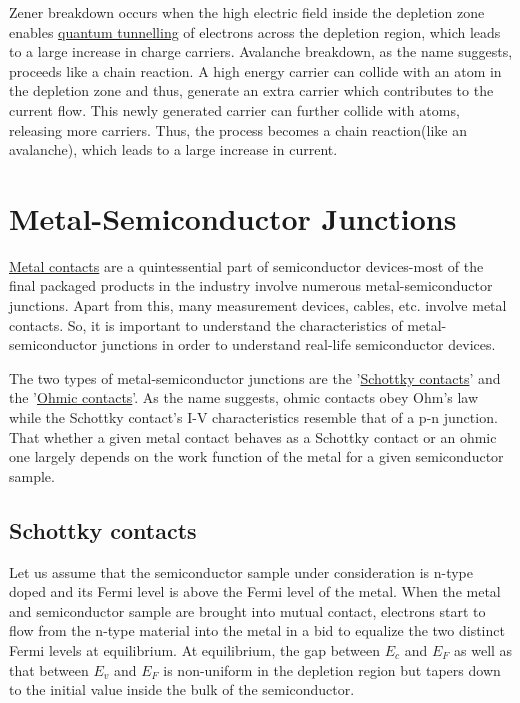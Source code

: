 \documentclass[12 pt]{article}
\begin{document}
Zener breakdown occurs when the high electric field inside the depletion zone enables \href{https://en.wikipedia.org/wiki/Quantum_tunnelling}{quantum tunnelling} of electrons across the depletion region, which leads to a large increase in charge carriers. Avalanche breakdown, as the name suggests, proceeds like a chain reaction. A high energy carrier can collide with an atom in the depletion zone and thus, generate an extra carrier which contributes to the current flow. This newly generated carrier can further collide with atoms, releasing more carriers. Thus, the process becomes a chain reaction(like an avalanche), which leads to a large increase in current. 

\section{Metal-Semiconductor Junctions}

\href{https://eng.libretexts.org/Bookshelves/Materials_Science/Supplemental_Modules_(Materials_Science)/Semiconductors/Metal-Semiconductors_Contacts}{Metal contacts} are a quintessential part of semiconductor devices-most of the final packaged products in the industry involve numerous metal-semiconductor junctions. Apart from this, many measurement devices, cables, etc. involve metal contacts. So, it is important to understand the characteristics of metal-semiconductor junctions in order to understand real-life semiconductor devices. \par

The two types of metal-semiconductor junctions are the '\href{https://en.wikipedia.org/wiki/Schottky_barrier}{Schottky contacts}' and the '\href{https://en.wikipedia.org/wiki/Ohmic_contact}{Ohmic contacts}'. As the name suggests, ohmic contacts obey Ohm's law while the Schottky contact's I-V characteristics resemble that of a p-n junction. That whether a given metal contact behaves as a Schottky contact or an ohmic one largely depends on the work function of the metal for a given semiconductor sample.  

\subsection{Schottky contacts}

Let us assume that the semiconductor sample under consideration is n-type doped and its Fermi level is above the Fermi level of the metal. When the metal and semiconductor sample are brought into mutual contact, electrons start to flow from the n-type material into the metal in a bid to equalize the two distinct Fermi levels at equilibrium. At equilibrium, the gap between $E_{c}$ and $E_{F}$ as well as that between $E_{v}$ and $E_{F}$ is non-uniform in the depletion region but tapers down to the initial value inside the bulk of the semiconductor. \newline
\end{document}
